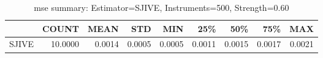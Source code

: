 \begin{table}[ht]
\centering
\caption{mse summary: Estimator=SJIVE, Instruments=500, Strength=0.60}
\begin{tabular}{lrrrrrrrr}
\toprule
 & COUNT & MEAN & STD & MIN & 25\% & 50\% & 75\% & MAX \\
\midrule
SJIVE & 10.0000 & 0.0014 & 0.0005 & 0.0005 & 0.0011 & 0.0015 & 0.0017 & 0.0021 \\
\bottomrule
\end{tabular}
\end{table}
